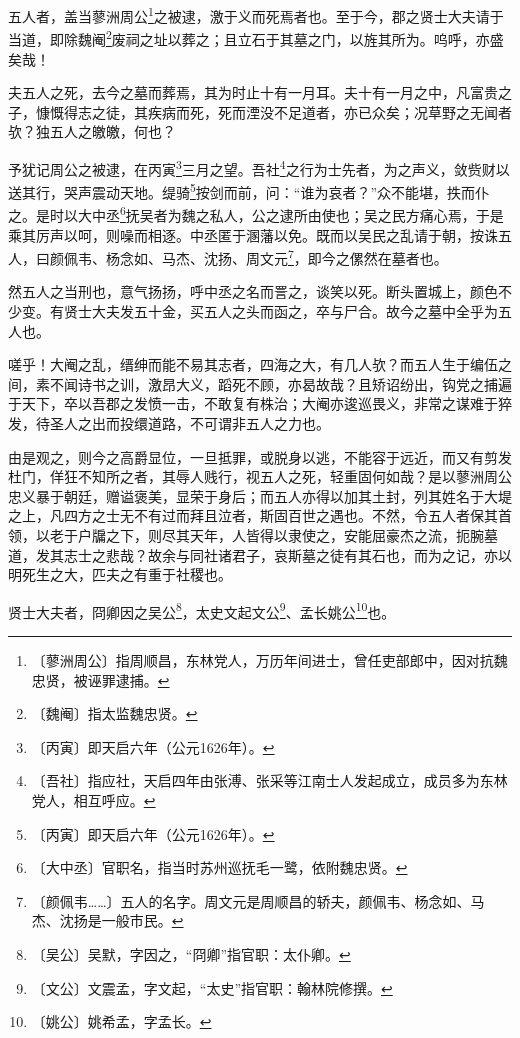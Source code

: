 \documentclass[12pt,UTF-8,openany]{ctexbook}
\begin{document}
\begin{normalsize}
    
    五人者，盖当蓼洲周公\footnote{〔蓼洲周公〕指周顺昌，东林党人，万历年间进士，曾任吏部郎中，因对抗魏忠贤，被诬罪逮捕。}之被逮，激于义而死焉者也。至于今，郡之贤士大夫请于当道，即除魏阉\footnote{〔魏阉〕指太监魏忠贤。}废祠之址以葬之；且立石于其墓之门，以旌其所为。呜呼，亦盛矣哉！
    
    夫五人之死，去今之墓而葬焉，其为时止十有一月耳。夫十有一月之中，凡富贵之子，慷慨得志之徒，其疾病而死，死而湮没不足道者，亦已众矣；况草野之无闻者欤？独五人之皦皦，何也？
    
    予犹记周公之被逮，在丙寅\footnote{〔丙寅〕即天启六年（公元1626年）。}三月之望。吾社\footnote{〔吾社〕指应社，天启四年由张溥、张采等江南士人发起成立，成员多为东林党人，相互呼应。}之行为士先者，为之声义，敛赀财以送其行，哭声震动天地。缇骑\footnote{〔丙寅〕即天启六年（公元1626年）。}按剑而前，问：“谁为哀者？”众不能堪，抶而仆之。是时以大中丞\footnote{〔大中丞〕官职名，指当时苏州巡抚毛一鹭，依附魏忠贤。}抚吴者为魏之私人，公之逮所由使也；吴之民方痛心焉，于是乘其厉声以呵，则噪而相逐。中丞匿于溷藩以免。既而以吴民之乱请于朝，按诛五人，曰颜佩韦、杨念如、马杰、沈扬、周文元\footnote{〔颜佩韦……〕五人的名字。周文元是周顺昌的轿夫，颜佩韦、杨念如、马杰、沈扬是一般市民。}，即今之傫然在墓者也。
    
    然五人之当刑也，意气扬扬，呼中丞之名而詈之，谈笑以死。断头置城上，颜色不少变。有贤士大夫发五十金，买五人之头而函之，卒与尸合。故今之墓中全乎为五人也。
    
    嗟乎！大阉之乱，缙绅而能不易其志者，四海之大，有几人欤？而五人生于编伍之间，素不闻诗书之训，激昂大义，蹈死不顾，亦曷故哉？且矫诏纷出，钩党之捕遍于天下，卒以吾郡之发愤一击，不敢复有株治；大阉亦逡巡畏义，非常之谋难于猝发，待圣人之出而投缳道路，不可谓非五人之力也。
    
    由是观之，则今之高爵显位，一旦抵罪，或脱身以逃，不能容于远近，而又有剪发杜门，佯狂不知所之者，其辱人贱行，视五人之死，轻重固何如哉？是以蓼洲周公忠义暴于朝廷，赠谥褒美，显荣于身后；而五人亦得以加其土封，列其姓名于大堤之上，凡四方之士无不有过而拜且泣者，斯固百世之遇也。不然，令五人者保其首领，以老于户牖之下，则尽其天年，人皆得以隶使之，安能屈豪杰之流，扼腕墓道，发其志士之悲哉？故余与同社诸君子，哀斯墓之徒有其石也，而为之记，亦以明死生之大，匹夫之有重于社稷也。
    
    贤士大夫者，冏卿因之吴公\footnote{〔吴公〕吴默，字因之，“冏卿”指官职：太仆卿。}，太史文起文公\footnote{〔文公〕文震孟，字文起，“太史”指官职：翰林院修撰。}、孟长姚公\footnote{〔姚公〕姚希孟，字孟长。}也。
\end{normalsize}
\end{document}

